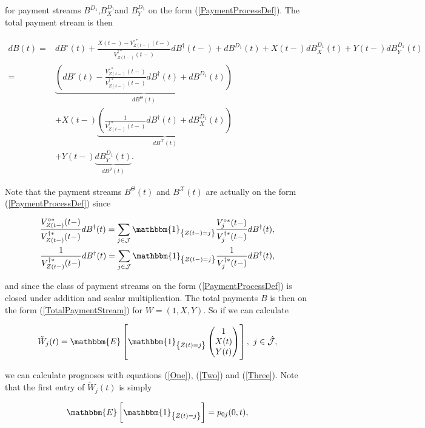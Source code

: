 \documentclass{article}
\newcommand{\1}[1]{\mathbbm{1}_{\left\lbrace #1 \right\rbrace}}
\newcommand{\expec}[1][def]{\mathbbm{E} \left[ #1 \right]}
\theoremstyle{break}
\theoremstyle{remark}
\numberwithin{equation}{section}
\begin{document}
for payment streams $B^{D_1}$,$B_X^{D_1}$and $B_Y^{D_1}$ on the form (\ref{PaymentProcessDef}). The total payment stream is then

\begin{align}
dB(t) =& dB^\circ(t) + \frac{X(t-) - V_{Z(t-)}^{\circ*}(t-)}{V_{Z(t-)}^{\dagger*}(t-)} dB^\dagger(t-) + dB^{D_1}(t) + X(t-) dB_X^{D_1}(t) + Y(t-) dB_Y^{D_1}(t) \nonumber \\
=& \underbrace{\left( dB^\circ(t) - \frac{V_{Z(t-)}^{\circ*}(t-)}{V_{Z(t-)}^{\dagger*}(t-)} dB^\dagger(t) + dB^{D_1}(t) \right)}_{dB^\Theta(t)} \label{FirstLine} \\
&+ X(t-) \underbrace{\left( \frac{1}{V_{Z(t-)}^{\dagger*}(t-)} dB^\dagger(t) + dB_X^{D_1}(t) \right)}_{dB^\mathcal{X}(t)} \label{SecondLine} \\
&+ Y(t-) \underbrace{dB_Y^{D_1}(t)}_{dB^\mathcal{Y}(t)}. \label{ThirdLine}
\end{align}

Note that the payment streams $B^\Theta(t)$ and $B^\mathcal{X}(t)$ are actually on the form (\ref{PaymentProcessDef}) since

\begin{align*}
	\frac{V_{Z(t-)}^{\circ*}(t-)}{V_{Z(t-)}^{\dagger*}(t-)} dB^\dagger(t) = \sum_{j \in \mathcal{J}} \1{Z(t-)=j} \frac{V_{j}^{\circ*}(t-)}{V_{j}^{\dagger*}(t-)} dB^\dagger(t), \\
	\frac{1}{V_{Z(t-)}^{\dagger*}(t-)} dB^\dagger(t) = \sum_{j \in \mathcal{J}} \1{Z(t-)=j} \frac{1}{V_{j}^{\dagger*}(t-)} dB^\dagger(t),
\end{align*}

and since the class of payment streams on the form (\ref{PaymentProcessDef}) is closed under addition and scalar multiplication. The total payments $B$ is then on the form (\ref{TotalPaymentStream}) for $W=(1,X,Y)$. So if we can calculate
	
\begin{align*}
	\tilde{W}_j(t) = \expec[\1{Z(t)=j}\begin{pmatrix}1  \\ X(t) \\ Y(t)\end{pmatrix}], \, \, j \in \hat{\mathcal{J}},
\end{align*}
	
we can calculate prognoses with equations (\ref{One}), (\ref{Two}) and (\ref{Three}). Note that the first entry of $\tilde{W}_j(t)$ is simply

\begin{align*}
	\expec[\1{Z(t)=j}] = p_{0j}(0,t),
\end{align*}
\end{document}
